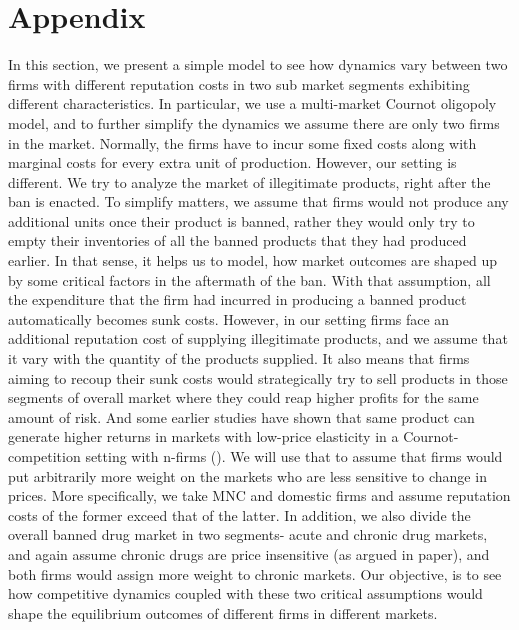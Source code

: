 \documentclass[AER]{AEA}
\theoremstyle{theorem}
\begin{document}


\newpage
\appendix
\section{Appendix}



In this section, we present a simple model to see how dynamics vary between two firms with different reputation costs in two sub market segments exhibiting different characteristics. In particular, we use a multi-market Cournot oligopoly model, and to further simplify the dynamics we assume there are only two firms in the market. Normally, the firms have to incur some fixed costs along with marginal costs for every extra unit of production. However, our setting is different. We try to analyze the market of illegitimate products, right after the ban is enacted. To simplify matters, we assume that firms would not produce any additional units once their product is banned, rather they would only try to empty their inventories of all the banned products that they had produced earlier. In that sense, it helps us to model, how market outcomes are shaped up by some critical factors in the aftermath of the ban. With that assumption, all the expenditure that the firm had incurred in producing a banned product automatically becomes sunk costs. However, in our setting firms face an additional reputation cost of supplying illegitimate products, and we assume that it vary with the quantity of the products supplied. It also means that firms aiming to recoup their sunk costs would strategically try to sell products in those segments of overall market where they could reap higher profits for the same amount of risk. And some earlier studies have shown that same product can generate higher returns in markets with low-price elasticity in a Cournot-competition setting with n-firms (\cite{aguirre2019oligopoly}). We will use that to assume that firms would put arbitrarily more weight on the markets who are less sensitive to change in prices. More specifically, we take MNC and domestic firms and assume reputation costs of the former exceed that of the latter. In addition, we also divide the overall banned drug market in two segments- acute and chronic drug markets, and again assume chronic drugs are price insensitive (as argued in paper), and both firms would assign more weight to chronic markets. Our objective, is to see how competitive dynamics coupled with these two critical assumptions would shape the equilibrium outcomes of different firms in different markets. 
\end{document}
